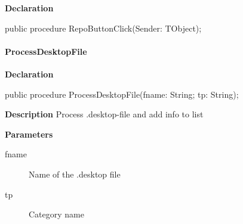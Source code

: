 \documentclass{report}
\newif\ifpdf
\begin{document}
\label{manager.TMnFrm-RepoButtonClick}
\begin{list}{}{
\setlength{\itemindent}{0cm}
\setlength{\listparindent}{0cm}
\setlength{\leftmargin}{\evensidemargin}
\addtolength{\leftmargin}{\tmplength}
\settowidth{\labelsep}{X}
\addtolength{\leftmargin}{\labelsep}
\setlength{\labelwidth}{\tmplength}
}
\item[\textbf{Declaration}\hfill]
\ifpdf
\begin{flushleft}
\fi
\begin{ttfamily}
public procedure RepoButtonClick(Sender: TObject);\end{ttfamily}

\ifpdf
\end{flushleft}
\fi

\end{list}
\paragraph*{ProcessDesktopFile}\hspace*{\fill}

\label{manager.TMnFrm-ProcessDesktopFile}
\begin{list}{}{
\setlength{\itemindent}{0cm}
\setlength{\listparindent}{0cm}
\setlength{\leftmargin}{\evensidemargin}
\addtolength{\leftmargin}{\tmplength}
\settowidth{\labelsep}{X}
\addtolength{\leftmargin}{\labelsep}
\setlength{\labelwidth}{\tmplength}
}
\item[\textbf{Declaration}\hfill]
\ifpdf
\begin{flushleft}
\fi
\begin{ttfamily}
public procedure ProcessDesktopFile(fname: String; tp: String);\end{ttfamily}

\ifpdf
\end{flushleft}
\fi

\par
\item[\textbf{Description}]
Process .desktop{-}file and add info to list  \par
\item[\textbf{Parameters}]
\begin{description}
\item[fname] Name of the .desktop file
\item[tp] Category name
\end{description}


\end{list}
\end{document}
